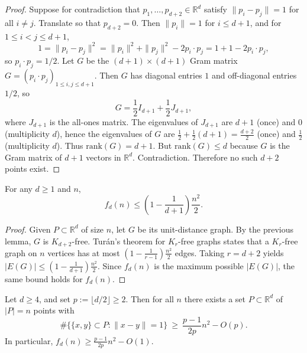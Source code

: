 \begin{proof}
Suppose for contradiction that \(p_1,\dots,p_{d+2}\in\mathbb{R}^d\) satisfy \(\|p_i-p_j\|=1\) for all \(i\ne j\).
Translate so that \(p_{d+2}=0\). Then \(\|p_i\|=1\) for \(i\le d+1\), and for \(1\le i<j\le d+1\),
\[
1=\|p_i-p_j\|^2=\|p_i\|^2+\|p_j\|^2-2p_i\cdot p_j=1+1-2p_i\cdot p_j,
\]
so \(p_i\cdot p_j=1/2\).
Let \(G\) be the \((d+1)\times(d+1)\) Gram matrix \(G=(p_i\cdot p_j)_{1\le i,j\le d+1}\). Then
\(G\) has diagonal entries \(1\) and off-diagonal entries \(1/2\), so
\[
G=\frac12 I_{d+1}+\frac12 J_{d+1},
\]
where \(J_{d+1}\) is the all-ones matrix.
The eigenvalues of \(J_{d+1}\) are \(d+1\) (once) and \(0\) (multiplicity \(d\)), hence the eigenvalues of \(G\) are
\(\tfrac12+\tfrac12(d+1)=\tfrac{d+2}{2}\) (once) and \(\tfrac12\) (multiplicity \(d\)).
Thus \(\mathrm{rank}(G)=d+1\).
But \(\mathrm{rank}(G)\le d\) because \(G\) is the Gram matrix of \(d+1\) vectors in \(\mathbb{R}^d\). Contradiction.
Therefore no such \(d+2\) points exist.
\end{proof}

\begin{lemma}
For any \(d\ge 1\) and \(n\),
\[
 f_d(n)\le \left(1-\frac{1}{d+1}\right)\frac{n^2}{2}.
\]
\end{lemma}

\begin{proof}
Given \(P\subset\mathbb{R}^d\) of size \(n\), let \(G\) be its unit-distance graph.
By the previous lemma, \(G\) is \(K_{d+2}\)-free.
Tur\'an's theorem for \(K_{r}\)-free graphs states that a \(K_r\)-free graph on \(n\) vertices has at most
\(\left(1-\frac{1}{r-1}\right)\frac{n^2}{2}\) edges.
Taking \(r=d+2\) yields
\(|E(G)|\le \left(1-\frac{1}{d+1}\right)\frac{n^2}{2}\).
Since \(f_d(n)\) is the maximum possible \(|E(G)|\), the same bound holds for \(f_d(n)\).
\end{proof}

\begin{lemma}
Let \(d\ge 4\), and set \(p:=\lfloor d/2\rfloor\ge 2\). Then for all \(n\) there exists a set \(P\subset\mathbb{R}^d\) of \(|P|=n\) points with
\[
\#\{\{x,y\}\subset P: \|x-y\|=1\}\ \ge\ \frac{p-1}{2p}n^2 - O(p).
\]
In particular, \(f_d(n)\ge \frac{p-1}{2p}n^2-O(1)\).
\end{lemma}

